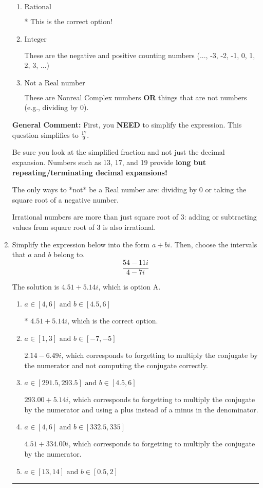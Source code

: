 \documentclass{extbook}[14pt]
\newcommand{\litem}[1]{\item #1

\rule{\textwidth}{0.4pt}}
\begin{document}
\begin{enumerate}
{\begin{enumerate}[label=\Alph*.]
These cannot be written as a fraction of Integers.
\item \( \text{Rational} \)

* This is the correct option!
\item \( \text{Integer} \)

These are the negative and positive counting numbers (..., -3, -2, -1, 0, 1, 2, 3, ...)
\item \( \text{Not a Real number} \)

These are Nonreal Complex numbers \textbf{OR} things that are not numbers (e.g., dividing by 0).
\end{enumerate}

\textbf{General Comment:} First, you \textbf{NEED} to simplify the expression. This question simplifies to $\frac{17}{9}$. 
 
 Be sure you look at the simplified fraction and not just the decimal expansion. Numbers such as 13, 17, and 19 provide \textbf{long but repeating/terminating decimal expansions!} 
 
 The only ways to *not* be a Real number are: dividing by 0 or taking the square root of a negative number. 
 
 Irrational numbers are more than just square root of 3: adding or subtracting values from square root of 3 is also irrational.
}
\litem{
Simplify the expression below into the form $a+bi$. Then, choose the intervals that $a$ and $b$ belong to.
\[ \frac{54 - 11 i}{4 - 7 i} \]

The solution is \( 4.51  + 5.14 i \), which is option A.\begin{enumerate}[label=\Alph*.]
\item \( a \in [4, 6] \text{ and } b \in [4.5, 6] \)

* $4.51  + 5.14 i$, which is the correct option.
\item \( a \in [1, 3] \text{ and } b \in [-7, -5] \)

 $2.14  - 6.49 i$, which corresponds to forgetting to multiply the conjugate by the numerator and not computing the conjugate correctly.
\item \( a \in [291.5, 293.5] \text{ and } b \in [4.5, 6] \)

 $293.00  + 5.14 i$, which corresponds to forgetting to multiply the conjugate by the numerator and using a plus instead of a minus in the denominator.
\item \( a \in [4, 6] \text{ and } b \in [332.5, 335] \)

 $4.51  + 334.00 i$, which corresponds to forgetting to multiply the conjugate by the numerator.
\item \( a \in [13, 14] \text{ and } b \in [0.5, 2] \)


\end{enumerate}}
\end{enumerate}
\end{document}
